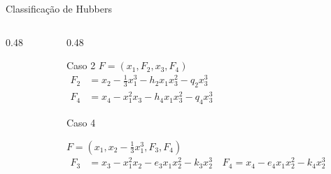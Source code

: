 \begin{frame}{Classificação de Hubbers}
\begin{columns}[t]
\begin{column}{0.48\textwidth}
        \end{column}

        \begin{column}{0.48\textwidth}
            \begin{block}{Caso 2}
                $F = (x_1, F_2, x_3, F_4)$ \\
                \vspace{0.2em}
                $\begin{aligned}
                    F_2 &= x_2 - \tfrac{1}{3} x_1^3 - h_2 x_1 x_3^2 - q_2 x_3^3 \\
                    F_4 &= x_4 - x_1^2 x_3 - h_4 x_1 x_3^2 - q_4 x_3^3
                \end{aligned}$
            \end{block}
            \vspace{0.9cm}
            \begin{block}{Caso 4}

                $F = (x_1, x_2 - \tfrac{1}{3} x_1^3, F_3, F_4)$ \\
                \vspace{0.2em}
                $\begin{aligned}
                    F_3 &= x_3 - x_1^2 x_2 - e_3 x_1 x_2^2 - k_3 x_2^3 \quad
                    F_4 = x_4 - e_4 x_1 x_2^2 - k_4 x_2^3
                \end{aligned}$
            \end{block}
        \end{column}
    \end{columns}
\end{frame}


